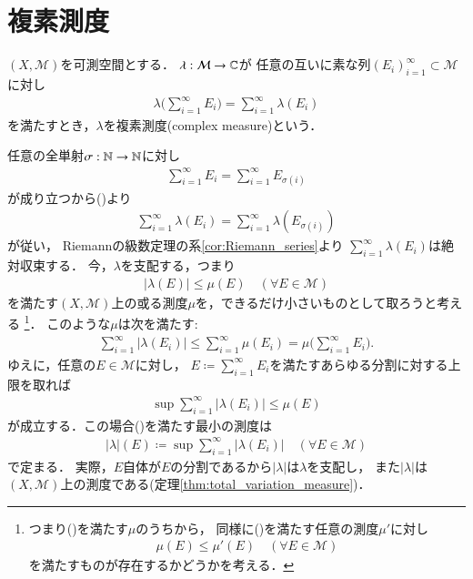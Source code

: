 \section{複素測度}

	\begin{screen}
		\begin{dfn}[複素測度]
			$(X,\mathcal{M})$を可測空間とする．
			$\lambda: \mathcal{M} \rightarrow \mathbb{C}$が
			任意の互いに素な列$(E_i)_{i=1}^{\infty} \subset \mathcal{M}$に対し
			\begin{align}
				\lambda\biggl( \sum_{i=1}^{\infty} E_i \biggr) = \sum_{i=1}^{\infty} \lambda(E_i)
				\label{eq:dfn_complex_measure}
			\end{align}
			を満たすとき，$\lambda$を複素測度(complex measure)という．
		\end{dfn}
	\end{screen}
	
	任意の全単射$\sigma:\mathbb{N} \rightarrow \mathbb{N}$に対し
	\begin{align}
		\sum_{i=1}^{\infty}E_i = \sum_{i=1}^{\infty}E_{\sigma(i)}
	\end{align}
	が成り立つから()より
	\begin{align}
		\sum_{i=1}^{\infty} \lambda(E_i) = \sum_{i=1}^{\infty} \lambda(E_{\sigma(i)})
	\end{align}
	が従い，
	Riemannの級数定理の系\ref{cor:Riemann_series}より
	$\sum_{i=1}^{\infty} \lambda(E_i)$は絶対収束する．
	今，$\lambda$を支配する，つまり
	\begin{align}
		|\lambda(E)| \leq \mu(E) \quad (\forall E \in \mathcal{M})
		\label{radon_nikodym_1}
	\end{align}
	を満たす$(X,\mathcal{M})$上の或る測度$\mu$を，できるだけ小さいものとして取ろうと考える
	\footnote{
		つまり()を満たす$\mu$のうちから，
		同様に()を満たす任意の測度$\mu'$に対し
		\begin{align}
			\mu(E) \leq \mu'(E) \quad (\forall E \in \mathcal{M})
		\end{align}
		を満たすものが存在するかどうかを考える．
	}．
	このような$\mu$は次を満たす:
	\begin{align}
		\sum_{i=1}^{\infty} |\lambda(E_i)| \leq \sum_{i=1}^{\infty} \mu(E_i) 
		= \mu \biggl( \sum_{i=1}^{\infty} E_i \biggr).
	\end{align}
	ゆえに，任意の$E \in \mathcal{M}$に対し，
	$E \coloneqq \sum_{i=1}^{\infty} E_i$を満たすあらゆる分割に対する上限を取れば
	\begin{align}
		\sup{}{\sum_{i=1}^{\infty} |\lambda(E_i)|} 
		\leq \mu(E)
		\label{radon_nikodym_2}
	\end{align}
	が成立する．この場合()を満たす最小の測度は
	\begin{align}
		|\lambda|(E) \coloneqq \sup{}{\sum_{i=1}^{\infty} |\lambda(E_i)|} \quad (\forall E \in \mathcal{M})
		\label{radon_nikodym_3}
	\end{align}
	で定まる．
	実際，$E$自体が$E$の分割であるから$|\lambda|$は$\lambda$を支配し，
	また$|\lambda|$は$(X,\mathcal{M})$上の測度である(定理\ref{thm:total_variation_measure})．
	
